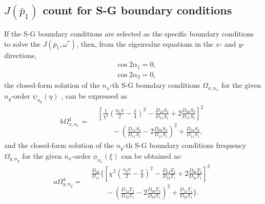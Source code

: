 \documentclass[preprint,12pt,number]{elsarticle}
\begin{document}
\begin{appendices}
\section{$J(\bar{p}_1)$ count for S-G boundary conditions}\label{sec:appendB}
If the S-G boundary conditions are selected as the specific boundary conditions to solve the $J(\bar{p}_1, \omega^*)$, then, from the eigenvalue equations in the $x$- and $y$-directions,
%
\begin{subequations}\label{eq:SGx} 
	\begin{align}
		&\cos 2\alpha_1 = 0,\\
		&\cos 2\alpha_2 = 0,
	\end{align}
\end{subequations}
%
the closed-form solution of the $n_x$-th S-G boundary conditions $\Omega_{x,n_x}$ for the given $n_y$-order $\psi_{n_y}(\eta)$ , can be expressed as
%
\begin{equation}\label{eq:J_simpx2}
	b \Omega^4_{x,n_x} =
	\begin{aligned}
		&\left[\frac{1}{\chi^2}\left(\frac{n_x\pi}{2}-\frac{\pi}{4}\right)^2 - \frac{D_{12}S_2}{D_{11}S_1} + 2 \frac{D_{66}S_3}{D_{11}S_1}\right]^2 \\
		&\qquad- \left(\frac{D_{12}S_2}{D_{11}S_1} - 2 \frac{D_{66}S_3}{D_{11}S_1}\right)^2
		+ \frac{D_{22}S_4}{D_{11}S_1},
	\end{aligned}
\end{equation}
%
and the closed-form solution of the $n_y$-th S-G boundary conditions frequency $\Omega_{y,n_y}$ for the given $n_x$-order $\phi_{n_x}(\xi)$ can be obtained as:
%
\begin{equation}\label{eq:J_simpy2}
	a\Omega^4_{y,n_y}= 
	\begin{aligned}
		&\frac{D_{22}}{D_{11}}\Biggl\{\left[\chi^2\left(\frac{n_y\pi}{2}-\frac{\pi}{4}\right)^2 - \frac{D_{12}T_2}{D_{22}T_1} + 2 \frac{D_{66}T_3}{D_{22}T_1}\right]^2 \\ 
		&\qquad - \left(\frac{D_{12}T_2}{D_{22}T_1} - 2 \frac{D_{66}T_3}{D_{22}T_1}\right)^2
		+ \frac{D_{11}T_4}{D_{22}T_1}\Biggr\}.
	\end{aligned}
\end{equation}
\end{appendices}
\FloatBarrier
%


\end{document}

